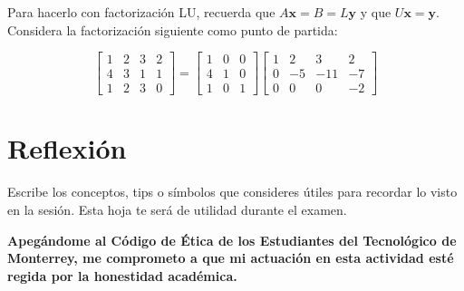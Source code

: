 \documentclass[spanish, 10pt]{article}
\begin{document}
Para hacerlo con factorización LU, recuerda que $A\mathbf{x} = B = L\mathbf{y}$ y que $U\mathbf{x} = \mathbf{y}$.
Considera la factorización siguiente como punto de partida:

\bigskip

$$\begin{bmatrix}
    1 & 2 & 3 & 2 \\
    4 & 3 & 1 & 1 \\
    1 & 2 & 3 & 0
\end{bmatrix}
=
\begin{bmatrix}
    1 & 0 & 0 \\
    4 & 1 & 0 \\
    1 & 0 & 1
\end{bmatrix}
\begin{bmatrix}
    1 & 2 & 3 & 2 \\
    0 & -5 & -11 & -7 \\
    0 & 0 & 0 & -2
\end{bmatrix}
$$

\pagebreak
\section*{Reflexión}

Escribe los conceptos, tips o símbolos que consideres útiles para recordar lo visto en la sesión. Esta hoja te será de utilidad durante el examen.

\vfill

\textbf{Apegándome al Código de Ética de los Estudiantes del Tecnológico de Monterrey, me comprometo a que mi actuación en esta actividad esté regida por la honestidad académica.}
\end{document}
